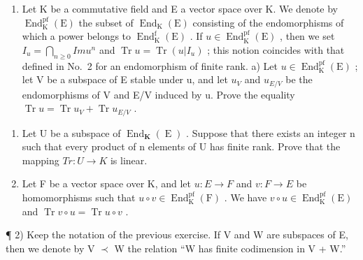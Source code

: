 
\begin{enumerate}
\def\labelenumi{\arabic{enumi})}
\tightlist
\item
  Let K be a commutative field and E a vector space over K. We denote by \(\operatorname{End}_{\mathrm{K}}^{\mathrm{pf}}(\mathrm{E})\) the subset of \(\operatorname{End}_{\mathrm{K}}(\mathrm{E})\) consisting of the endomorphisms of which a power belongs to \(\operatorname{End}_{\mathrm{K}}^{\mathrm{f}}(\mathrm{E})\) . If \(u \in \operatorname{End}_{\mathrm{K}}^{\mathrm{pf}}(\mathrm{E})\) , then we set \(I_{u} = \bigcap_{n \geqslant 0} Im u^{n}\) and \(\operatorname{Tr} u = \operatorname{Tr}(u | I_{u})\) ; this notion coincides with that defined in No.~2 for an endomorphism of finite rank. a) Let \(u \in \operatorname{End}_{\mathrm{K}}^{\mathrm{pf}}(\mathrm{E})\) ; let V be a subspace of E stable under u, and let \(u_{V}\) and \(u_{E/V}\) be the endomorphisms of V and E/V induced by u. Prove the equality \(\operatorname{Tr} u = \operatorname{Tr} u_{V} + \operatorname{Tr} u_{E/V}\) .
\end{enumerate}

\begin{enumerate}
\def\labelenumi{\alph{enumi})}
\setcounter{enumi}{1}
\item
  Let U be a subspace of \(\operatorname{End}_{\mathbf{K}}(\operatorname{E})\) . Suppose that there exists an integer n such that every product of n elements of U has finite rank. Prove that the mapping \(Tr: U \to K\) is linear.
\item
  Let F be a vector space over K, and let \(u: E \to F\) and \(v: F \to E\) be homomorphisms such that \(u \circ v \in \operatorname{End}_{\mathrm{K}}^{\mathrm{pf}}(\mathrm{F})\) . We have \(v \circ u \in \operatorname{End}_{\mathrm{K}}^{\mathrm{pf}}(\mathrm{E})\) and \(\operatorname{Tr} v \circ u = \operatorname{Tr} u \circ v\) .
\end{enumerate}

¶ 2) Keep the notation of the previous exercise. If V and W are subspaces of E, then we denote by V \(\prec\) W the relation ``W has finite codimension in V + W.''

